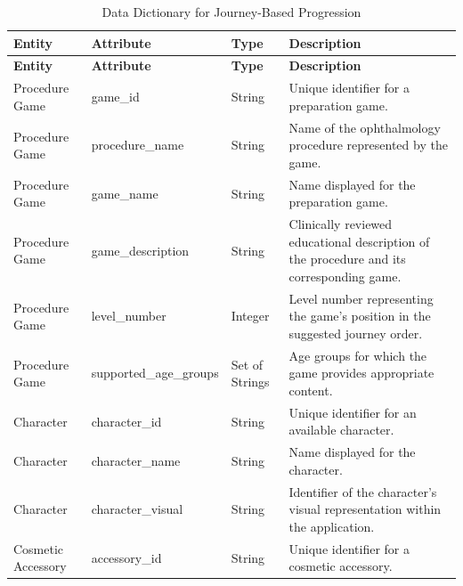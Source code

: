 \documentclass[12pt]{article}
\begin{document}
\begin{longtable}{
    p{}
    p{}
    p{}
    p{}
}

\caption{Data Dictionary for Journey-Based Progression}
\label{tab:JourneyDataDictionary}\\

\toprule
\textbf{Entity} &
\textbf{Attribute} &
\textbf{Type} &
\textbf{Description} \\
\midrule
\endfirsthead

\toprule
\textbf{Entity} &
\textbf{Attribute} &
\textbf{Type} &
\textbf{Description} \\
\midrule
\endhead

Procedure Game &
game\_id &
String &
Unique identifier for a preparation game. \\
\midrule

Procedure Game &
procedure\_name &
String &
Name of the ophthalmology procedure represented
by the game. \\
\midrule

Procedure Game &
game\_name &
String &
Name displayed for the preparation game. \\
\midrule

Procedure Game &
game\_description &
String &
Clinically reviewed educational description
of the procedure and its corresponding game. \\
\midrule

Procedure Game &
level\_number &
Integer &
Level number representing the game's position
in the suggested journey order. \\
\midrule

Procedure Game &
supported\_age\_groups &
Set of Strings &
Age groups for which the game provides
appropriate content. \\
\midrule

Character &
character\_id &
String &
Unique identifier for an available character. \\
\midrule

Character &
character\_name &
String &
Name displayed for the character. \\
\midrule

Character &
character\_visual &
String &
Identifier of the character's visual representation
within the application. \\
\midrule

Cosmetic Accessory &
accessory\_id &
String &
Unique identifier for a cosmetic accessory. \\
\midrule


\end{longtable}
\end{document}
